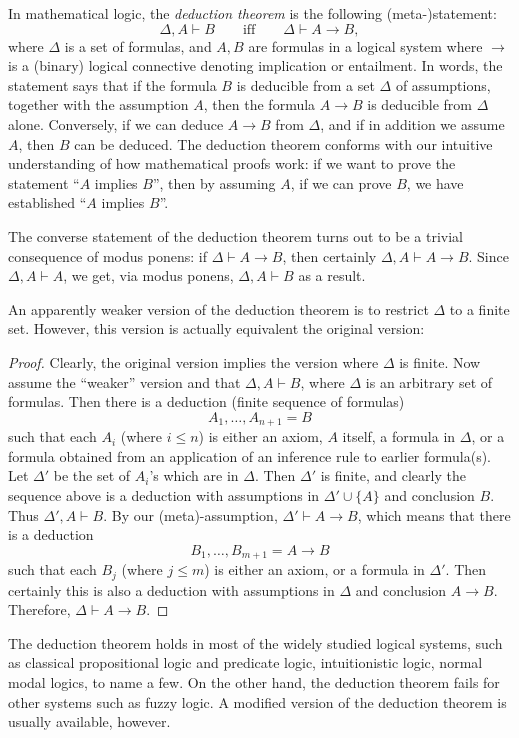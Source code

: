 \documentclass[12pt]{article}
\begin{document}
In mathematical logic, the \emph{deduction theorem} is the following (meta-)statement:
$$\Delta, A \vdash B\qquad \mbox{iff} \qquad \Delta \vdash A\to B,$$ 
where $\Delta$ is a set of formulas, and $A,B$ are formulas in a logical system where $\to$ is a (binary) logical connective denoting implication or entailment.  In words, the statement says that if the formula $B$ is deducible from a set $\Delta$ of assumptions, together with the assumption $A$, then the formula $A\to B$ is deducible from $\Delta$ alone.  Conversely, if we can deduce $A\to B$ from $\Delta$, and if in addition we assume $A$, then $B$ can be deduced.  The deduction theorem conforms with our intuitive understanding of how mathematical proofs work: if we want to prove the statement ``$A$ implies $B$'', then by assuming $A$, if we can prove $B$, we have established ``$A$ implies $B$''.

The converse statement of the deduction theorem turns out to be a trivial consequence of modus ponens: if $\Delta \vdash A\to B$, then certainly $\Delta, A \vdash A\to B$.  Since $\Delta, A \vdash A$, we get, via modus ponens, $\Delta, A \vdash B$ as a result.

An apparently weaker version of the deduction theorem is to restrict $\Delta$ to a finite set.  However, this version is actually equivalent the original version:
\begin{proof}
Clearly, the original version implies the version where $\Delta$ is finite.  Now assume the ``weaker'' version and that $\Delta, A \vdash B$, where $\Delta$ is an arbitrary set of formulas.  Then there is a deduction (finite sequence of formulas) $$A_1,\ldots, A_{n+1} = B$$
such that each $A_i$ (where $i\le n$) is either an axiom, $A$ itself, a formula in $\Delta$, or a formula obtained from an application of an inference rule to earlier formula(s).  Let $\Delta'$ be the set of $A_i$'s which are in $\Delta$.  Then $\Delta'$ is finite, and clearly the sequence above is a deduction with assumptions in $\Delta'\cup \lbrace A \rbrace$ and conclusion $B$.  Thus $\Delta', A \vdash B$.  By our (meta)-assumption, $\Delta' \vdash A\to B$, which means that there is a deduction $$B_1,\ldots, B_{m+1}=A\to B$$ such that each $B_j$ (where $j\le m$) is either an axiom, or a formula in $\Delta'$.  Then certainly this is also a deduction with assumptions in $\Delta$ and conclusion $A\to B$.  Therefore, $\Delta \vdash A\to B$.
\end{proof}

The deduction theorem holds in most of the widely studied logical systems, such as classical propositional logic and predicate logic, intuitionistic logic, normal modal logics, to name a few.  On the other hand, the deduction theorem fails for other systems such as fuzzy logic.  A modified version of the deduction theorem is usually available, however.
\end{document}
